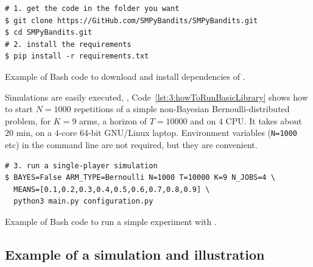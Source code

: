 \begin{small}
    \begin{listing}[h!]
        \begin{verbatim}
# 1. get the code in the folder you want
$ git clone https://GitHub.com/SMPyBandits/SMPyBandits.git
$ cd SMPyBandits.git
# 2. install the requirements
$ pip install -r requirements.txt
        \end{verbatim}
        \caption{Example of Bash code to download and install dependencies of \SMPyBandits.}
        \label{lst:3:howToInstallLibrary}
    \end{listing}
\end{small}

Simulations are easily executed, \eg, Code~\ref{lst:3:howToRunBasicLibrary} shows how to start $N=1000$ repetitions of a simple non-Bayesian Bernoulli-distributed problem, for $K=9$ arms, a horizon of $T=10000$ and on $4$ CPU.
It takes about $20$ min, on a $4$-core $64$-bit GNU/Linux laptop.
Environment variables (\texttt{N=1000} etc) in the command line are not required, but they are convenient.

\begin{small}
\begin{listing}[h!]
    \begin{verbatim}
# 3. run a single-player simulation
$ BAYES=False ARM_TYPE=Bernoulli N=1000 T=10000 K=9 N_JOBS=4 \
  MEANS=[0.1,0.2,0.3,0.4,0.5,0.6,0.7,0.8,0.9] \
  python3 main.py configuration.py
    \end{verbatim}
    \caption{Example of Bash code to run a simple experiment with \SMPyBandits.}
    \label{lst:3:howToRunBasicLibrary}
\end{listing}
\end{small}


\subsection{Example of a simulation and illustration}

